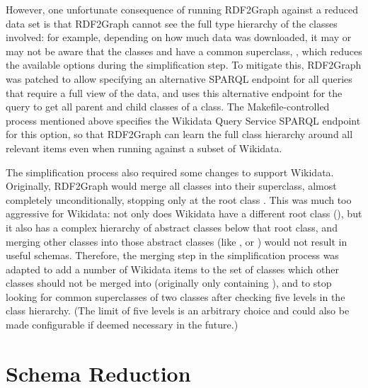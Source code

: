 However, one unfortunate consequence of running RDF2Graph against a reduced data set
is that RDF2Graph cannot see the full type hierarchy of the classes involved:
for example, depending on how much data was downloaded,
it may or may not be aware that the classes  and 
have a common superclass, ,
which reduces the available options during the simplification step. %
To mitigate this, RDF2Graph was patched %
to allow specifying an alternative SPARQL endpoint for all queries that require a full view of the data,
and uses this alternative endpoint for the query to get all parent and child classes of a class.
The Makefile-controlled process mentioned above %
specifies the Wikidata Query Service SPARQL endpoint for this option,
so that RDF2Graph can learn the full class hierarchy around all relevant items %
even when running against a subset of Wikidata. %

The simplification process also required some changes to support Wikidata.
Originally, RDF2Graph would merge all classes into their superclass,
almost completely unconditionally,
stopping only at the root class .
This was much too aggressive for Wikidata:
not only does Wikidata have a different root class (),
but it also has a complex hierarchy of abstract classes below that root class,
and merging other classes into those abstract classes
(like ,  or )
would not result in useful schemas.
Therefore, the merging step in the simplification process was adapted %
to add a number of Wikidata items to the set of classes which other classes should not be merged into
(originally only containing ),
and to stop looking for common superclasses of two classes after checking five levels in the class hierarchy.
(The limit of five levels is an arbitrary choice
and could also be made configurable if deemed necessary in the future.) %

\section{Schema Reduction}
\label{sec:RDF2Graph+Wikidata:schema-reduction}


